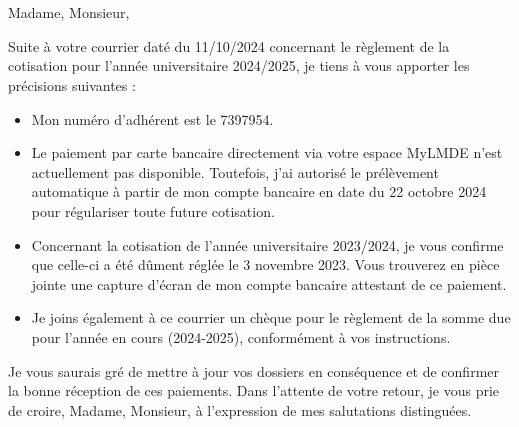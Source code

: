 \documentclass[11pt,a4paper]{lettre}
\begin{document}
\begin{letter} 
{}\\
\\
\address{M. \textsc{Benane} Gaya\\
171 Avenue de Luminy\\
Logement EF38\\
13~009~\textsc{Marseille}}  

\signature{ Gaya \textsc{Benane}}
\nofax
\date{\today}

{}
\opening{\hspace{1em} Madame, Monsieur,}
\hspace{1em}Suite à votre courrier daté du 11/10/2024 concernant le règlement de la cotisation pour l'année universitaire 2024/2025, je tiens à vous apporter les précisions suivantes :%
\vspace{1em}
\begin{itemize}
    \item Mon numéro d'adhérent est le 7397954.
\item Le paiement par carte bancaire directement via votre espace MyLMDE n'est actuellement pas disponible. Toutefois, j'ai autorisé le prélèvement automatique à partir de mon compte bancaire en date du 22 octobre 2024 pour régulariser toute future cotisation.
\item Concernant la cotisation de l'année universitaire 2023/2024, je vous confirme que celle-ci a été dûment réglée le 3 novembre 2023. Vous trouverez en pièce jointe une capture d'écran de mon compte bancaire attestant de ce paiement.
\item Je joins également à ce courrier un chèque pour le règlement de la somme due pour l'année en cours (2024-2025), conformément à vos instructions.
\end{itemize}
\vspace{2em}
\hspace{1em}
Je vous saurais gré de mettre à jour vos dossiers en conséquence et de confirmer la bonne réception de ces paiements. Dans l’attente de votre retour, je vous prie de croire, Madame, Monsieur, à l'expression de mes salutations distinguées.
\closing{}
\end{letter}
\end{document}
